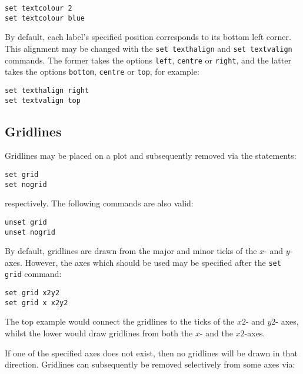 \begin{verbatim}
set textcolour 2
set textcolour blue
\end{verbatim}

By default, each label's specified position corresponds to its bottom left corner. This alignment may be changed with the \texttt{set texthalign} and \texttt{set textvalign} commands. The former takes the options \texttt{left}, \texttt{centre} or \texttt{right}, and the latter takes the options \texttt{bottom}, \texttt{centre} or \texttt{top}, for example:

\begin{verbatim}
set texthalign right
set textvalign top
\end{verbatim}

\subsection{Gridlines}

Gridlines may be placed on a plot and subsequently removed via the statements:

\begin{verbatim}
set grid
set nogrid
\end{verbatim}

\noindent respectively. The following commands are also valid:

\begin{verbatim}
unset grid
unset nogrid
\end{verbatim}

\noindent By default, gridlines are drawn from the major and minor ticks of the
$x$- and $y$-axes. However, the axes which should be used may be specified
after the \texttt{set grid} command:

\begin{verbatim}
set grid x2y2
set grid x x2y2
\end{verbatim}

\noindent The top example would connect the gridlines to the ticks of the $x2$-
and $y2$- axes, whilst the lower would draw gridlines from both the $x$- and
the $x2$-axes.

If one of the specified axes does not exist, then no gridlines will be drawn in
that direction.  Gridlines can subsequently be removed selectively from some
axes via:

